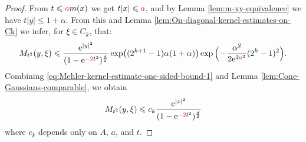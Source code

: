 \documentclass{amsart}
\theoremstyle{remark}
\renewcommand{\leq}{\leqslant}
\renewcommand{\leq}{\leqslant}
\newcommand{\R}{\mathbf R}
\newcommand{\e}{\mathrm{e}} %
\renewcommand{\leq}{\leqslant}%
\newcommand{\red}{\color{red}}
\begin{document}
\begin{proof}
  From $t \leq
  {\red a} m(x)$ we get $t |x| \leq {\red a}$, and by
  Lemma \ref{lem:m-xy-equivalence} we have $t |y| \leq 1 + \alpha$.
  From this and Lemma \ref{lem:On-diagonal-kernel-estimates-on-Ck} we infer, {\red for
  $\xi\in C_k$}, that:
  \begin{equation}
    \label{eq:Mehler-kernel-estimate-one-sided-bound-1}
   M_{t^2}(y, \xi) \leq  \frac{\e^{|y|^2}}{(1 -
      \e^{-{\red 2}{t^2}})^{\frac{d}2}} \exp\bigl((2^{k + 1} - 1) \alpha (1 + \alpha) \bigr)
    \exp\Big(\!-\!\frac{\alpha^2}{2 \e^{2{\red a}^2}} (2^k - 1)^2 \Big).
  \end{equation}
Combining \eqref{eq:Mehler-kernel-estimate-one-sided-bound-1} and Lemma \ref{lem:Cone-Gaussians-comparable}, we obtain
$$  M_{t^2}(y, \xi) \leq  c_k\frac{\e^{|x|^2}}{(1 - \e^{-{\red 2}{t^2}})^{\frac{d}2}}
$$       
where $c_k$ depends only on $A$, $a$, and $t$.
%

\end{proof}
\end{document}
